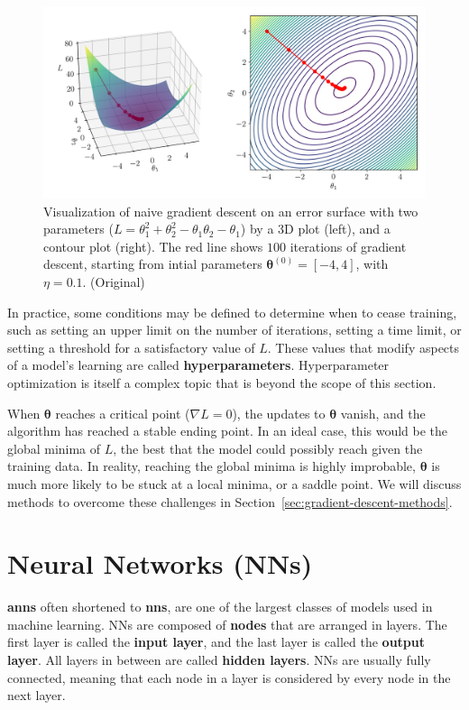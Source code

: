 \documentclass[12pt]{report}
\theoremstyle{definition}
\theoremstyle{remark}
\begin{document}
\begin{figure}[h]
    \centering
    \includegraphics[width=\linewidth]{figs/gradient_descent.png}
    \caption{Visualization of naive gradient descent on an error surface with two parameters ($L = \theta_1^2 + \theta_2^2 - \theta_1\theta_2 - \theta_1$) by a 3D plot (left), and a contour plot (right). The red line shows $100$ iterations of gradient descent, starting from intial parameters $\boldsymbol{\theta}^{(0)} = [-4,4]$, with $\eta = 0.1$. (Original)}
    \label{fig:enter-label}
\end{figure}

In practice, some conditions may be defined to determine when to cease training, such as setting an upper limit on the number of iterations, setting a time limit, or setting a threshold for a satisfactory value of $L$. These values that modify aspects of a model's learning are called \textbf{\glspl{hyperparameter}}. Hyperparameter optimization is itself a complex topic that is beyond the scope of this section.

When $\boldsymbol{\theta}$ reaches a critical point ($\nabla L = 0$), the updates to $\boldsymbol{\theta}$ vanish, and the algorithm has reached a stable ending point. In an ideal case, this would be the global minima of $L$, the best that the model could possibly reach given the training data. In reality, reaching the global minima is highly improbable, $\boldsymbol{\theta}$ is much more likely to be stuck at a local minima, or a saddle point. We will discuss methods to overcome these challenges in Section~\ref{sec:gradient-descent-methods}.

\section{Neural Networks (NNs)}\label{sec:nn}

\textbf{\Glspl{ann}} often shortened to \textbf{\glspl{nn}}, are one of the largest classes of models used in machine learning. NNs are composed of \textbf{\glspl{node}} that are arranged in layers. The first layer is called the \textbf{input layer}, and the last layer is called the \textbf{output layer}. All layers in between are called \textbf{hidden layers}. NNs are usually fully connected, meaning that each node in a layer is considered by every node in the next layer.
\end{document}
